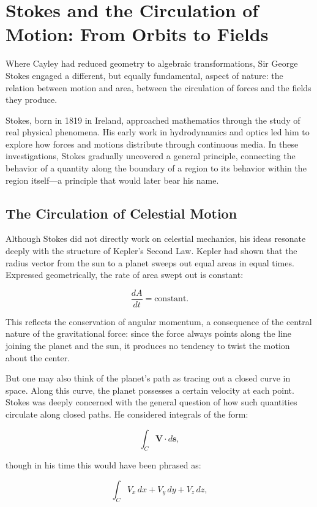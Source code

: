 \section{Stokes and the Circulation of Motion: From Orbits to Fields}

Where Cayley had reduced geometry to algebraic transformations, Sir George Stokes engaged a different, but equally fundamental, aspect of nature: the relation between motion and area, between the circulation of forces and the fields they produce.

Stokes, born in 1819 in Ireland, approached mathematics through the study of real physical phenomena. His early work in hydrodynamics and optics led him to explore how forces and motions distribute through continuous media. In these investigations, Stokes gradually uncovered a general principle, connecting the behavior of a quantity along the boundary of a region to its behavior within the region itself—a principle that would later bear his name.

\subsection{The Circulation of Celestial Motion}

Although Stokes did not directly work on celestial mechanics, his ideas resonate deeply with the structure of Kepler’s Second Law. Kepler had shown that the radius vector from the sun to a planet sweeps out equal areas in equal times. Expressed geometrically, the rate of area swept out is constant:

\[
\frac{dA}{dt} = \text{constant}.
\]

This reflects the conservation of angular momentum, a consequence of the central nature of the gravitational force: since the force always points along the line joining the planet and the sun, it produces no tendency to twist the motion about the center.

But one may also think of the planet’s path as tracing out a closed curve in space. Along this curve, the planet possesses a certain velocity at each point. Stokes was deeply concerned with the general question of how such quantities circulate along closed paths. He considered integrals of the form:

\[
\int_{C} \mathbf{V} \cdot d\mathbf{s},
\]

though in his time this would have been phrased as:

\[
\int_{C} V_x\, dx + V_y\, dy + V_z\, dz,
\]

